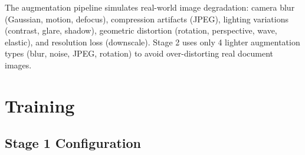 \documentclass[11pt]{article}
\begin{document}
The augmentation pipeline simulates real-world image degradation: camera blur (Gaussian, motion, defocus), compression artifacts (JPEG), lighting variations (contrast, glare, shadow), geometric distortion (rotation, perspective, wave, elastic), and resolution loss (downscale). 
Stage 2 uses only 4 lighter augmentation types (blur, noise, JPEG, rotation) to avoid over-distorting real document images.

\section{Training}

\subsection{Stage 1 Configuration}

\begin{table}[t]
\centering
\small
{}
\caption{Complete training hyperparameters for both stages.}
\label{tab:training}
\end{table}
\end{document}
